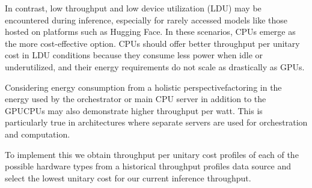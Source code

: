 In contrast, low throughput and low device utilization (LDU) may be encountered during inference, especially for rarely accessed models like those hosted on platforms such as Hugging Face. In these scenarios, CPUs emerge as the more cost-effective option. CPUs should offer better throughput per unitary cost in LDU conditions because they consume less power when idle or underutilized, and their energy requirements do not scale as drastically as GPUs.

Considering energy consumption from a holistic perspective\textemdash{}factoring in the energy used by the orchestrator or main CPU server in addition to the GPU\textemdash{}CPUs may also demonstrate higher throughput per watt. This is particularly true in architectures where separate servers are used for orchestration and computation. 

To implement this we obtain throughput per unitary cost profiles of each of the possible hardware types from a historical throughput profiles data source and select the lowest unitary cost for our current inference throughput.

\pagebreak
\endinput
\section{Development Process}
Suspendisse vestibulum dignissim quam. Integer vel augue. Phasellus nulla purus, interdum ac, venenatis non, varius rutrum, leo. Pellentesque habitant morbi tristique senectus et netus et malesuada fames ac turpis egestas. Duis a eros. Class aptent taciti sociosqu ad litora torquent per conubia nostra, per inceptos hymenaeos. Fusce magna mi, porttitor quis, convallis eget, sodales ac, urna. Phasellus luctus venenatis magna. Vivamus eget lacus. Nunc tincidunt convallis tortor. Duis eros mi, dictum vel, fringilla sit amet, fermentum id, sem. Phasellus nunc enim, faucibus ut, laoreet in, consequat id, metus. Vivamus dignissim. Cras lobortis tempor velit. Phasellus nec diam ac nisl lacinia tristique. Nullam nec metus id mi dictum dignissim. Nullam quis wisi non sem lobortis condimentum. Phasellus pulvinar, nulla non aliquam eleifend, tortor wisi scelerisque felis, in sollicitudin arcu ante lacinia leo.:

\begin{itemize}
\item{Technology Research and Related Works}
\item{Requirements Gathering and Study}
\item{Design of the Architecture}
\item{Implementation Process}
\item{Testing and Functional Validation}
\end{itemize}

